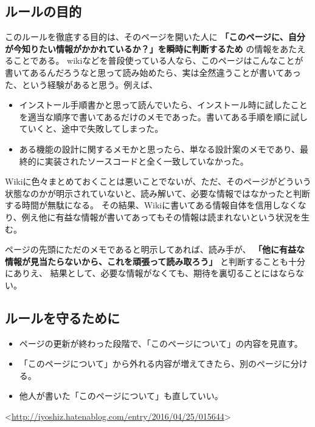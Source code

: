 \documentclass[letterpaper,10pt,dvipdfmx]{sphinxmanual}
\begin{document}
\subsection{ルールの目的}
\label{tips:id7}
このルールを徹底する目的は、そのページを開いた人に \textbf{「このページに、自分が今知りたい情報がかかれているか？」を瞬時に判断するため} の情報をあたえることである。
wikiなどを普段使っている人なら、このページはこんなことが書いてあるんだろうなと思って読み始めたら、実は全然違うことが書いてあった、という経験があると思う。例えば、
\begin{itemize}
\item {} 
インストール手順書かと思って読んでいたら、インストール時に試したことを適当な順序で書いてあるだけのメモであった。書いてある手順を順に試していくと、途中で失敗してしまった。

\item {} 
ある機能の設計に関するメモかと思ったら、単なる設計案のメモであり、最終的に実装されたソースコードと全く一致していなかった。

\end{itemize}

Wikiに色々まとめておくことは悪いことでないが、ただ、そのページがどういう状態なのかが明示されていないと、読み解いて、必要な情報ではなかったと判断する時間が無駄になる。
その結果、Wikiに書いてある情報自体を信用しなくなり、例え他に有益な情報が書いてあってもその情報は読まれないという状況を生む。

ページの先頭にただのメモであると明示してあれば、読み手が、 \textbf{「他に有益な情報が見当たらないから、これを頑張って読み取ろう」} と判断することも十分にありえ、
結果として、必要な情報がなくても、期待を裏切ることにはならない。


\subsection{ルールを守るために}
\label{tips:id8}\begin{itemize}
\item {} 
ページの更新が終わった段階で、「このページについて」の内容を見直す。

\item {} 
「このページについて」から外れる内容が増えてきたら、別のページに分ける。

\item {} 
他人が書いた「このページについて」も直していい。

\end{itemize}

\textless{}\url{http://iyoshiz.hatenablog.com/entry/2016/04/25/015644}\textgreater{}
\end{document}
